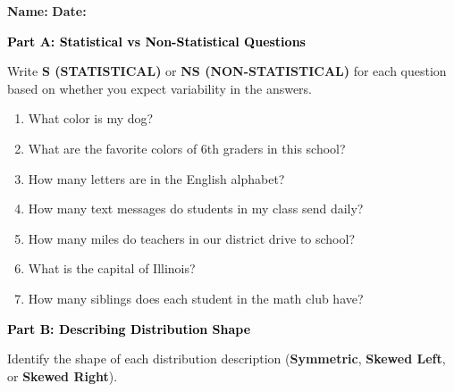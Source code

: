 \documentclass[12pt, letterpaper, fleqn]{article}
\newcommand{\blank}{\underline{\hspace{2.2cm}}}
\begin{document}
\textbf{Name:} \underline{\hspace{5cm}}
\hfill
\textbf{Date:} \underline{\hspace{3cm}}\\

\begin{tcolorbox}[colback=black!10]
    \large\textcolor{black}{\textbf{Part A: Statistical vs Non-Statistical Questions}}
\end{tcolorbox}

\vspace{3mm}

\noindent
Write \textbf{S (STATISTICAL)} or \textbf{NS (NON-STATISTICAL)} for each question based on whether you expect variability in the answers.

\vspace{5mm}

\begin{enumerate}[itemsep=1.8cm, leftmargin=0.6cm]
\item What color is my dog? \hfill \blank
\item What are the favorite colors of 6th graders in this school? \hfill \blank
\item How many letters are in the English alphabet? \hfill \blank
\item How many text messages do students in my class send daily? \hfill \blank
\item How many miles do teachers in our district drive to school? \hfill \blank
\item What is the capital of Illinois? \hfill \blank
\item How many siblings does each student in the math club have? \hfill \blank
\end{enumerate}

\newpage

\begin{tcolorbox}[colback=black!10]
    \large\textcolor{black}{\textbf{Part B: Describing Distribution Shape}}
\end{tcolorbox}

\vspace{3mm}

\noindent
Identify the shape of each distribution description (\textbf{Symmetric}, \textbf{Skewed Left}, or \textbf{Skewed Right}).
\end{document}
